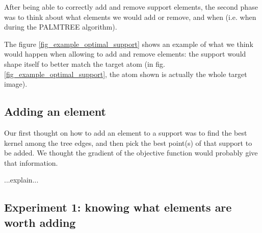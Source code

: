 After being able to correctly add and remove support elements, the second phase was to think about what elements we would add or remove, and when (i.e. when during the PALMTREE algorithm).

The figure \ref{fig_example_optimal_support} shows an example of what we think would happen when allowing to add and remove elements: the support would shape itself to better match the target atom (in fig.\ref{fig_example_optimal_support}, the atom shown is actually the whole target image).


\subsection{Adding an element}
Our first thought on how to add an element to a support was to find the best kernel among the tree edges, and then pick the best point(s) of that support to be added. We thought the gradient of the objective function would probably give that information. 

...explain...

\subsection{Experiment 1: knowing what elements are worth adding}

